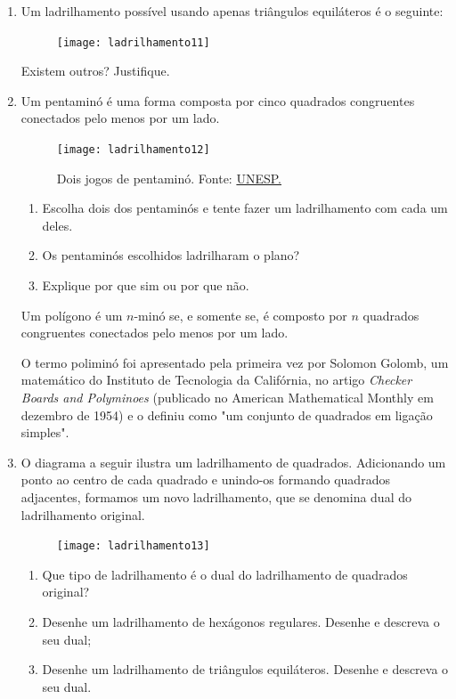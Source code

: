 \begin{enumerate}
	\item Um ladrilhamento possível usando apenas triângulos equiláteros é o seguinte:

	\begin{figure}[H]
	\centering
	\texttt{[image: ladrilhamento11]}
	\end{figure}

	Existem outros? Justifique.

	\item Um pentaminó é uma forma composta por cinco quadrados congruentes conectados pelo menos por um lado.

	\begin{figure}[H]
	\centering
	\texttt{[image: ladrilhamento12]}

	\caption{Dois jogos de pentaminó. Fonte: \href{https://www.ibilce.unesp.br/departamentos/matematica/eventos/3-cejta/regra-dos-jogos/9-ano---pentamino/}{UNESP.}}
	\end{figure}
	
	\begin{enumerate}
		\item Escolha dois dos pentaminós e tente fazer um ladrilhamento com cada um deles.
		\item Os pentaminós escolhidos ladrilharam o plano?
		\item Explique por que sim ou por que não.
	\end{enumerate}

	\begin{knowledge}
		Um polígono é um $n$-minó se, e somente se, é composto por $n$ quadrados congruentes conectados pelo menos por um lado.

		O termo poliminó foi apresentado pela primeira vez por Solomon Golomb, um matemático do Instituto de Tecnologia da Califórnia, no artigo \textit{Checker Boards and Polyminoes} (publicado no American Mathematical Monthly em dezembro de 1954) e o definiu como "um conjunto de quadrados em ligação simples".
	\end{knowledge}

	\item O diagrama a seguir ilustra um ladrilhamento de quadrados. Adicionando um ponto ao centro de cada quadrado e unindo-os formando quadrados adjacentes, formamos um novo ladrilhamento, que se denomina dual do ladrilhamento original.

	\begin{figure}[H]
	\centering
	\texttt{[image: ladrilhamento13]}
	\end{figure}

	\begin{enumerate}
		\item Que tipo de ladrilhamento é o dual do ladrilhamento de quadrados original?
		\item Desenhe um ladrilhamento de hexágonos regulares. Desenhe e descreva o seu dual;
		\item Desenhe um ladrilhamento de triângulos equiláteros. Desenhe e descreva o seu dual.
	\end{enumerate}
\end{enumerate}


